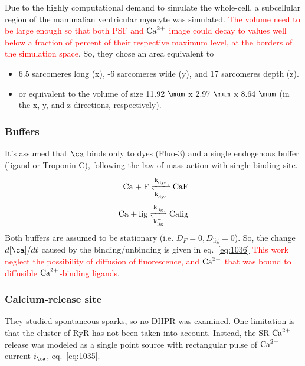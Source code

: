 Due to the highly computational demand to simulate the whole-cell, a
subcellular region of the mammalian ventricular myocyte was simulated.
\textcolor{red}{The volume need to be large enough so that both PSF
  and ${\text{Ca}^{2+}}$ image could decay to values well below a fraction of
  percent of their respective maximum level, at the borders of the
  simulation space}.  So, they chose an area equivalent to
\begin{itemize}
\item 6.5 sarcomeres long (x), -6 sarcomeres wide (y), and 17
  sarcomeres depth (z).

\item or equivalent to the volume of size 11.92 $\mum$ x 2.97 $\mum$ x
  8.64 $\mum$ (in the x, y, and z directions, respectively).
\end{itemize}


\subsubsection{Buffers}
\label{sec:buffers-2}

It's assumed that $\ca$ binds only to dyes (Fluo-3) and a single
endogenous buffer (ligand or Troponin-C), following the law of mass
action with single binding site.  \def\lig{{\text{lig}}}
\def\dye{{\text{dye}}}
\begin{equation}
  \label{eq:1116}
  \begin{split}
    \ce{Ca + F <=>[k^+_\dye][k^-_\dye] CaF} \\
    \ce{Ca + lig <=>[k^+_\lig][k^-_\lig] Calig} 
  \end{split}
\end{equation}
Both buffers are assumed to be stationary (i.e. $D_F=0, D_\lig=0$)\citep{berlin1994iccb}.
So, the change $d[\ca]/dt$ caused by the binding/unbinding is given in eq.~\eqref{eq:1036}
\textcolor{red}{This work neglect the possibility of diffusion of fluorescence,
and ${\text{Ca}^{2+}}$ that was bound to diffusible ${\text{Ca}^{2+}}$-binding ligands}.



\subsubsection{Calcium-release site}
\label{sec:calcium-release-site}

They studied spontaneous sparks, so no DHPR was examined. One
limitation is that the cluster of RyR has not been taken into
account. Instead, the SR ${\text{Ca}^{2+}}$ release was modeled as a single point
source with rectangular pulse of ${\text{Ca}^{2+}}$ current $i_\ca$,
eq.~\eqref{eq:1035}.

